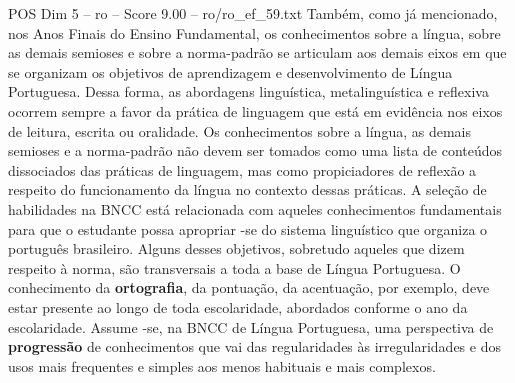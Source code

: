 \begin{textsample}{POS Dim 5 – ro – Score 9.00 – ro/ro\_ef\_59.txt}
Também, como já mencionado, nos Anos Finais do Ensino Fundamental, os conhecimentos sobre a língua, sobre as demais semioses e sobre a norma-padrão se articulam aos demais eixos em que se organizam os objetivos de aprendizagem e desenvolvimento de Língua Portuguesa.
Dessa forma, as abordagens linguística, metalinguística e reflexiva ocorrem sempre a favor da prática de linguagem que está em evidência nos eixos de leitura, escrita ou oralidade.
Os conhecimentos sobre a língua, as demais semioses e a norma-padrão não devem ser tomados como uma lista de conteúdos dissociados das práticas de linguagem, mas como propiciadores de reflexão a respeito do funcionamento da língua no contexto dessas práticas.
A seleção de habilidades na BNCC está relacionada com aqueles conhecimentos fundamentais para que o estudante possa apropriar -se do sistema linguístico que organiza o português brasileiro.
Alguns desses objetivos, sobretudo aqueles que dizem respeito à norma, são transversais a toda a base de Língua Portuguesa.
O conhecimento da \textbf{ortografia}, da pontuação, da acentuação, por exemplo, deve estar presente ao longo de toda escolaridade, abordados conforme o ano da escolaridade.
Assume -se, na BNCC de Língua Portuguesa, uma perspectiva de \textbf{progressão} de conhecimentos que vai das regularidades às irregularidades e dos usos mais frequentes e simples aos menos habituais e mais complexos.

\end{textsample}
